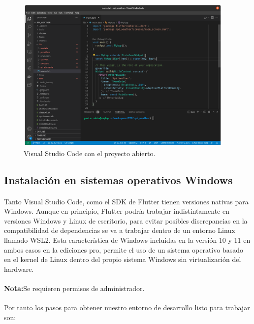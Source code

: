 \begin{figure}[H]
    \centering
    \includegraphics[width=0.95\textwidth]{imgs/vscode-ready}
	\caption[Visual Studio Code]{Visual Studio Code con el proyecto abierto.}
	\label{imgs:vscode-ready}
\end{figure}


\subsection{Instalación en sistemas operativos Windows}

\paragraph{}Tanto Visual Studio Code, como el \gls{SDK} de Flutter tienen versiones
nativas para Windows. Aunque en principio, Flutter podría trabajar indistintamente en
versiones Windows y Linux de escritorio, para evitar posibles discrepancias en la
compatibilidad de dependencias se va a trabajar dentro de un entorno Linux llamado
\gls{WSL2}. Esta característica de Windows incluidas en la versión 10 y 11 en ambos
casos en la ediciones pro, permite el uso de un sistema operativo basado en el kernel
de Linux dentro del propio sistema Windows sin virtualización del hardware.

\paragraph{}\textbf{Nota:}Se requieren permisos de administrador.

\paragraph{}Por tanto los pasos para obtener nuestro entorno de desarrollo listo para
trabajar son:

